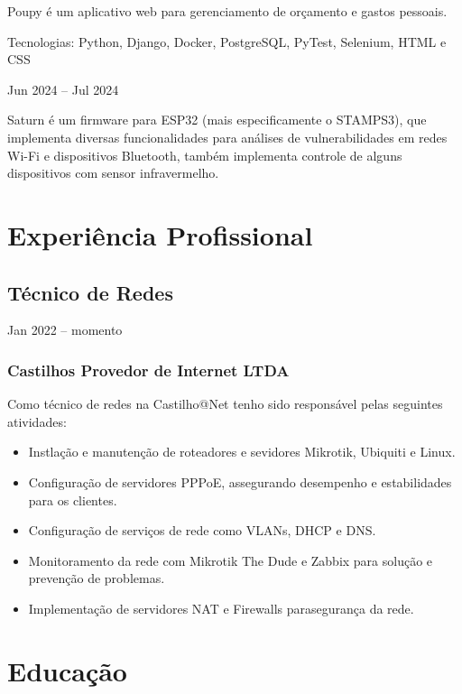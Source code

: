 \documentclass{cv}
\begin{document}
Poupy é um aplicativo web para gerenciamento de orçamento e gastos pessoais.

\vspace{0.08cm}

Tecnologias: Python, Django, Docker, PostgreSQL, PyTest, Selenium, HTML e CSS

\hfill{Jun 2024 -- Jul 2024}\\
\vspace{0.15cm}

Saturn é um firmware para ESP32 (mais especificamente o STAMPS3), que implementa diversas funcionalidades
para análises de vulnerabilidades em redes Wi-Fi e dispositivos Bluetooth,
também implementa controle de alguns dispositivos com sensor infravermelho.

\section{Experiência Profissional}

\subsection{Técnico de Redes}
{Jan 2022 -- momento}
\subsubsection{Castilhos Provedor de Internet LTDA}

Como técnico de redes na Castilho@Net tenho sido responsável pelas
seguintes atividades:

\begin{itemize}
  \item Instlação e manutenção de roteadores e sevidores Mikrotik,
    Ubiquiti e Linux.
  \item Configuração de servidores PPPoE, assegurando desempenho e
    estabilidades para os clientes.
  \item Configuração de serviços de rede como VLANs, DHCP e DNS.
  \item Monitoramento da rede com Mikrotik The Dude e Zabbix para
    solução e prevenção de problemas.
  \item Implementação de servidores NAT e Firewalls parasegurança da rede.
\end{itemize}

\section{Educação}
\end{document}
